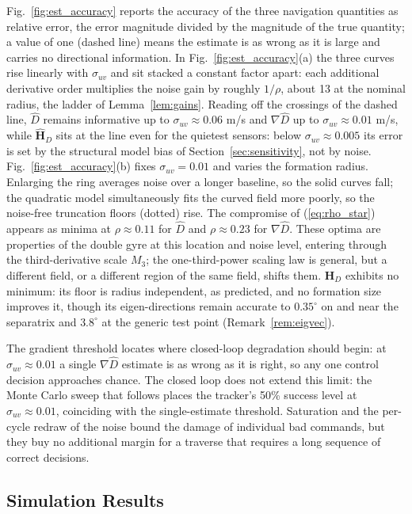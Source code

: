 \documentclass[lettersize,journal]{IEEEtran}
\begin{document}
Fig.~\ref{fig:est_accuracy} reports the accuracy of the three navigation
quantities as relative error, the error magnitude divided by the
magnitude of the true quantity; a value of one (dashed line) means the
estimate is as wrong as it is large and carries no directional
information. In Fig.~\ref{fig:est_accuracy}(a) the three curves rise
linearly with $\sigma_{uv}$ and sit stacked a constant factor apart: each
additional derivative order multiplies the noise gain by roughly
$1/\rho$, about 13 at the nominal radius, the ladder of
Lemma~\ref{lem:gains}. Reading off the crossings of the dashed line,
$\hat{D}$ remains informative up to $\sigma_{uv} \approx 0.06$ m/s and
$\nabla\hat{D}$ up to $\sigma_{uv} \approx 0.01$ m/s, while
$\hat{\mathbf{H}}_D$ sits at the line even for the quietest sensors:
below $\sigma_{uv} \approx 0.005$ its error is set by the structural
model bias of Section~\ref{sec:sensitivity}, not by noise.
Fig.~\ref{fig:est_accuracy}(b) fixes $\sigma_{uv} = 0.01$ and varies the
formation radius. Enlarging the ring averages noise over a longer
baseline, so the solid curves fall; the quadratic model simultaneously
fits the curved field more poorly, so the noise-free truncation floors
(dotted) rise. The compromise of (\ref{eq:rho_star}) appears as minima
at $\rho \approx 0.11$ for $\hat{D}$ and $\rho \approx 0.23$ for
$\nabla\hat{D}$. These optima are properties of the double gyre at this
location and noise level, entering through the third-derivative scale
$M_3$; the one-third-power scaling law is general, but a different
field, or a different region of the same field, shifts them.
$\hat{\mathbf{H}}_D$ exhibits no minimum: its floor is radius
independent, as predicted, and no formation size improves it, though its
eigen-directions remain accurate to $0.35^\circ$ on and near the
separatrix and $3.8^\circ$ at the generic test point
(Remark~\ref{rem:eigvec}).

The gradient threshold locates where closed-loop degradation should
begin: at $\sigma_{uv} \approx 0.01$ a single $\nabla\hat{D}$ estimate
is as wrong as it is right, so any one control decision approaches
chance. The closed loop does not extend this limit: the Monte Carlo
sweep that follows places the tracker's 50\% success level at
$\sigma_{uv} \approx 0.01$, coinciding with the single-estimate
threshold. Saturation and the per-cycle redraw of the noise bound the
damage of individual bad commands, but they buy no additional margin
for a traverse that requires a long sequence of correct decisions.

\subsection{Simulation Results}
\end{document}
